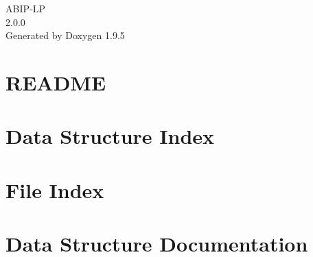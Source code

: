 \documentclass[twoside]{book}
\newcommand{\+}{\discretionary{\mbox{\scriptsize$\hookleftarrow$}}{}{}}
\newcommand{\clearemptydoublepage}{%
    \newpage{\pagestyle{empty}\cleardoublepage}%
  }
\begin{document}
  \raggedbottom
    \hypersetup{pageanchor=false,
                bookmarksnumbered=true,
                pdfencoding=unicode
               }
  \begin{titlepage}
  \vspace*{7cm}
  \begin{center}%
  {\Large ABIP-\/\+LP}\\
  [1ex]\large 2.\+0.\+0 \\
  \vspace*{1cm}
  {\large Generated by Doxygen 1.9.5}\\
  \end{center}
  \end{titlepage}
  \clearemptydoublepage
  \tableofcontents
  \clearemptydoublepage
  \hypersetup{pageanchor=true}
\chapter{README}
\label{md_external__r_e_a_d_m_e}

\chapter{Data Structure Index}

\chapter{File Index}

\chapter{Data Structure Documentation}











\end{document}
